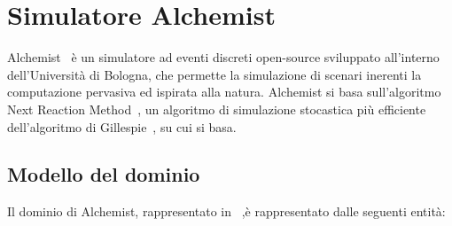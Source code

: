 \documentclass[12pt,a4paper,openright,twoside]{book}
\begin{document}
\section{Simulatore Alchemist}

Alchemist~\cite{DBLP:journals/jos/PianiniMV13} è un simulatore ad eventi discreti open-source sviluppato all'interno dell'Università di Bologna, che permette la simulazione di scenari inerenti la computazione pervasiva ed ispirata alla natura. 
Alchemist si basa sull'algoritmo Next Reaction Method~\cite{doi:10.1021/jp993732q}, un algoritmo di simulazione stocastica più efficiente dell'algoritmo di Gillespie~\cite{doi:10.1021/j100540a008}, su cui si basa.

\subsection{Modello del dominio}
Il dominio di Alchemist, rappresentato in~ ,è rappresentato dalle seguenti entità: 
\end{document}
